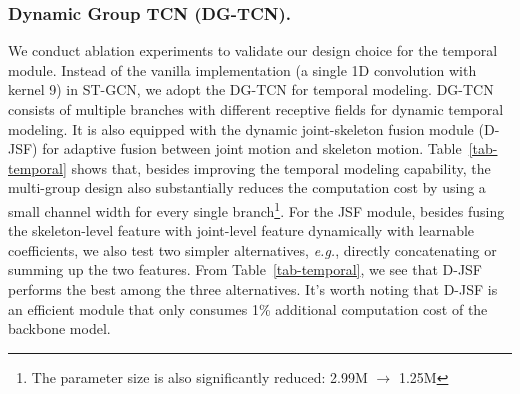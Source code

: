 \subsubsection{Dynamic Group TCN (DG-TCN). }
We conduct ablation experiments to validate our design choice for the temporal module. 
Instead of the vanilla implementation (a single 1D convolution with kernel 9) in ST-GCN, we adopt the DG-TCN for temporal modeling.
DG-TCN consists of multiple branches with different receptive fields for dynamic temporal modeling.
It is also equipped with the dynamic joint-skeleton fusion module (D-JSF) for adaptive fusion between joint motion and skeleton motion. 
Table~\ref{tab-temporal} shows that, besides improving the temporal modeling capability, the multi-group design also substantially reduces the computation cost by using a small channel width for every single branch\footnote{The parameter size is also significantly reduced: 2.99M $\rightarrow$ 1.25M}. 
For the JSF module, besides fusing the skeleton-level feature with joint-level feature dynamically with learnable coefficients, 
we also test two simpler alternatives, \emph{e.g.}, directly concatenating or summing up the two features. 
From Table~\ref{tab-temporal}, we see that D-JSF performs the best among the three alternatives. 
It's worth noting that D-JSF is an efficient module that only consumes 1\% additional computation cost of the backbone model. 

\begin{table}[t]
    \captionsetup{font=small, position=top}
	\centering 
    \caption{\textbf{Validating Uniform Sampling and two alternatives adopted in previous works on multiple backbones. 
    $\Delta$ denotes the gain from Uniform Sampling compared to the baseline without temporal augmentation. }}
    \vspace{1mm}
	\label{tab-aug}
    \vspace{-6mm}
\end{table}

